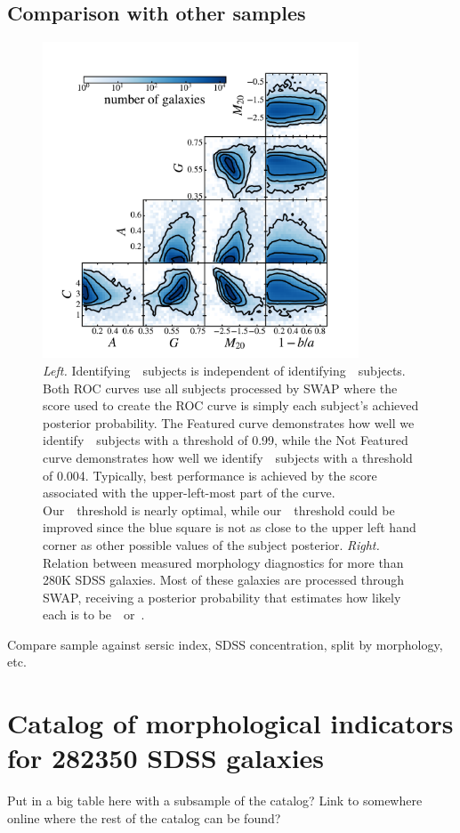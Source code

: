 \subsection{Comparison with other samples}
\begin{figure}[t!]
\includegraphics[width=3.7in]{Figures/human_machine/A2b.pdf}
\caption{\textit{Left.} Identifying~\feat~subjects is independent of identifying~\notfeat~subjects.  Both ROC curves use all subjects processed by SWAP where the score used to create the ROC curve is simply each subject's achieved posterior probability. The Featured curve demonstrates how well we identify~\feat~subjects with a threshold of 0.99, while the Not Featured curve demonstrates how well we identify~\notfeat~subjects with a threshold of 0.004. Typically, best performance is achieved by the score associated with the upper-left-most part of the curve. Our~\feat~threshold is nearly optimal, while our~\notfeat~threshold could be improved since the blue square is not as close to the upper left hand corner as other possible values of the subject posterior. \textit{Right.} Relation between measured morphology diagnostics for more than 280K SDSS galaxies. Most of these galaxies are processed through SWAP, receiving a posterior probability that estimates how likely each is to be~\feat~or~\notfeat.}
\label{fig: morph thresh}
\end{figure}


Compare sample against sersic index, SDSS concentration, split by morphology, etc. 


\section{Catalog of morphological indicators for 282350 SDSS galaxies}
Put in a big table here with a subsample of the catalog? Link to somewhere online where the rest of the catalog can be found? 